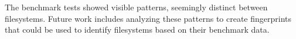 The benchmark tests showed visible patterns, seemingly distinct between filesystems. Future work includes analyzing these patterns to create fingerprints that could be used to identify filesystems based on their benchmark data.

%
%